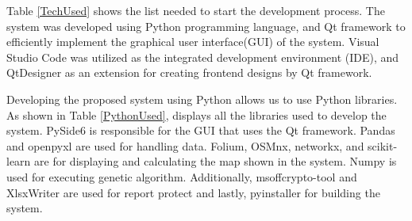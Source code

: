 	Table \ref{TechUsed} shows the list needed to start the development process. The system was developed using Python programming language, and Qt framework to efficiently implement the graphical user interface(GUI) of the system. Visual Studio Code was utilized as the integrated development environment (IDE), and QtDesigner as an extension for creating frontend designs by Qt framework.
	
	\begin{table}[h]
		\centering
		\caption{List of tools and technologies used in the development process}
		\label{TechUsed}
		\renewcommand{\arraystretch}{1.3}
	\end{table}
	
	Developing the proposed system using Python allows us to use Python libraries. As shown in Table \ref{PythonUsed}, displays all the libraries used to develop the system. PySide6 is responsible for the GUI that uses the Qt framework. Pandas and openpyxl are used for handling data. Folium, OSMnx, networkx, and scikit-learn are for displaying and calculating the map shown in the system. Numpy is used for executing genetic algorithm. Additionally, msoffcrypto-tool and XlsxWriter are used for report protect and lastly, pyinstaller for building the system.
	
